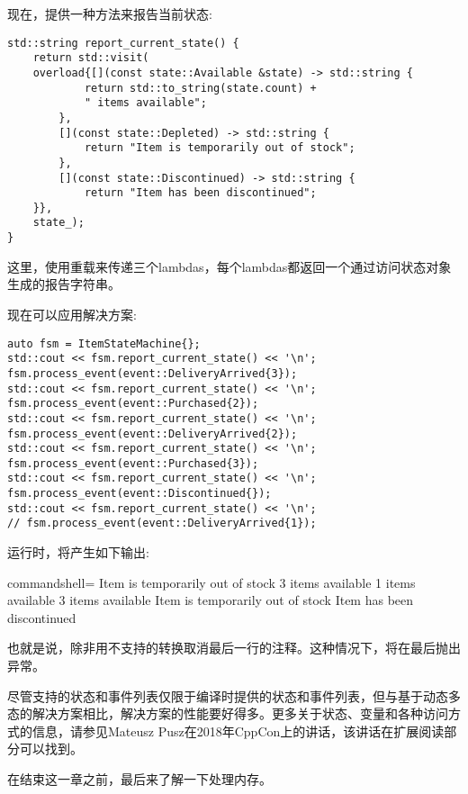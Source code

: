 现在，提供一种方法来报告当前状态:

\begin{lstlisting}[style=styleCXX]
std::string report_current_state() {
	return std::visit(
	overload{[](const state::Available &state) -> std::string {
			return std::to_string(state.count) +
			" items available";
		},
		[](const state::Depleted) -> std::string {
			return "Item is temporarily out of stock";
		},
		[](const state::Discontinued) -> std::string {
			return "Item has been discontinued";
	}},
	state_);
}
\end{lstlisting}

这里，使用重载来传递三个lambdas，每个lambdas都返回一个通过访问状态对象生成的报告字符串。

现在可以应用解决方案:

\begin{lstlisting}[style=styleCXX]
auto fsm = ItemStateMachine{};
std::cout << fsm.report_current_state() << '\n';
fsm.process_event(event::DeliveryArrived{3});
std::cout << fsm.report_current_state() << '\n';
fsm.process_event(event::Purchased{2});
std::cout << fsm.report_current_state() << '\n';
fsm.process_event(event::DeliveryArrived{2});
std::cout << fsm.report_current_state() << '\n';
fsm.process_event(event::Purchased{3});
std::cout << fsm.report_current_state() << '\n';
fsm.process_event(event::Discontinued{});
std::cout << fsm.report_current_state() << '\n';
// fsm.process_event(event::DeliveryArrived{1});
\end{lstlisting}

运行时，将产生如下输出:

\begin{tcblisting}{commandshell={}}
Item is temporarily out of stock
3 items available
1 items available
3 items available
Item is temporarily out of stock
Item has been discontinued
\end{tcblisting}

也就是说，除非用不支持的转换取消最后一行的注释。这种情况下，将在最后抛出异常。

尽管支持的状态和事件列表仅限于编译时提供的状态和事件列表，但与基于动态多态的解决方案相比，解决方案的性能要好得多。更多关于状态、变量和各种访问方式的信息，请参见Mateusz Pusz在2018年CppCon上的讲话，该讲话在扩展阅读部分可以找到。

在结束这一章之前，最后来了解一下处理内存。
